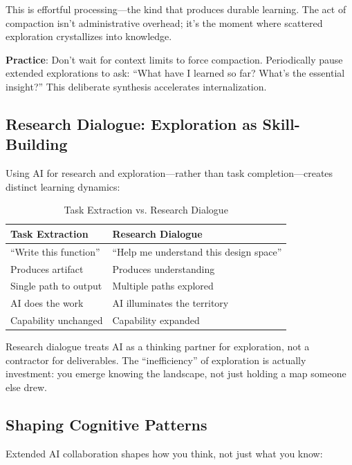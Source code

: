 This is effortful processing---the kind that produces durable learning. The act of compaction isn't administrative overhead; it's the moment where scattered exploration crystallizes into knowledge.

\begin{quotebox}
\textbf{Practice}: Don't wait for context limits to force compaction. Periodically pause extended explorations to ask: ``What have I learned so far? What's the essential insight?'' This deliberate synthesis accelerates internalization.
\end{quotebox}

\subsection{Research Dialogue: Exploration as Skill-Building}

Using AI for research and exploration---rather than task completion---creates distinct learning dynamics:

\begin{table}[H]
\centering
\begin{tabular}{ll}
\toprule
\textbf{Task Extraction} & \textbf{Research Dialogue} \\
\midrule
``Write this function'' & ``Help me understand this design space'' \\
Produces artifact & Produces understanding \\
Single path to output & Multiple paths explored \\
AI does the work & AI illuminates the territory \\
Capability unchanged & Capability expanded \\
\bottomrule
\end{tabular}
\caption{Task Extraction vs. Research Dialogue}
\end{table}

Research dialogue treats AI as a thinking partner for exploration, not a contractor for deliverables. The ``inefficiency'' of exploration is actually investment: you emerge knowing the landscape, not just holding a map someone else drew.

\subsection{Shaping Cognitive Patterns}

Extended AI collaboration shapes how you think, not just what you know:

